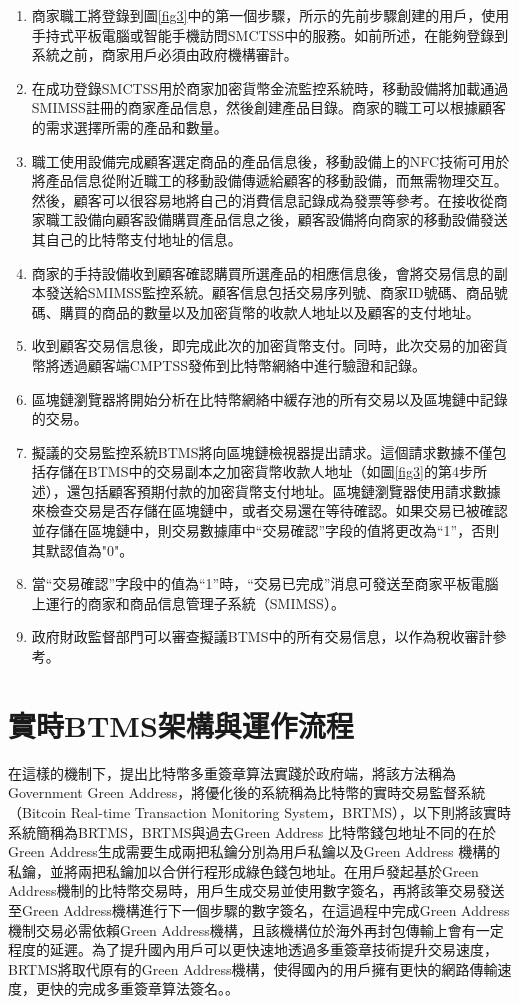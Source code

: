 		\begin{enumerate}
			\item 商家職工將登錄到圖\ref{fig3}中的第一個步驟，所示的先前步驟創建的用戶，使用手持式平板電腦或智能手機訪問SMCTSS中的服務。如前所述，在能夠登錄到系統之前，商家用戶必須由政府機構審計。
			\item 在成功登錄SMCTSS用於商家加密貨幣金流監控系統時，移動設備將加載通過SMIMSS註冊的商家產品信息，然後創建產品目錄。商家的職工可以根據顧客的需求選擇所需的產品和數量。

			\item 職工使用設備完成顧客選定商品的產品信息後，移動設備上的NFC技術可用於將產品信息從附近職工的移動設備傳遞給顧客的移動設備，而無需物理交互。然後，顧客可以很容易地將自己的消費信息記錄成為發票等參考。在接收從商家職工設備向顧客設備購買產品信息之後，顧客設備將向商家的移動設備發送其自己的比特幣支付地址的信息。
			\item 商家的手持設備收到顧客確認購買所選產品的相應信息後，會將交易信息的副本發送給SMIMSS監控系統。顧客信息包括交易序列號、商家ID號碼、商品號碼、購買的商品的數量以及加密貨幣的收款人地址以及顧客的支付地址。
			\item 收到顧客交易信息後，即完成此次的加密貨幣支付。同時，此次交易的加密貨幣將透過顧客端CMPTSS發佈到比特幣網絡中進行驗證和記錄。
			\item 區塊鏈瀏覽器將開始分析在比特幣網絡中緩存池的所有交易以及區塊鏈中記錄的交易。
			\item 擬議的交易監控系統BTMS將向區塊鏈檢視器提出請求。這個請求數據不僅包括存儲在BTMS中的交易副本之加密貨幣收款人地址（如圖\ref{fig3}的第4步所述），還包括顧客預期付款的加密貨幣支付地址。區塊鏈瀏覽器使用請求數據來檢查交易是否存儲在區塊鏈中，或者交易還在等待確認。如果交易已被確認並存儲在區塊鏈中，則交易數據庫中“交易確認”字段的值將更改為“1”，否則其默認值為"0"。
			\item 當“交易確認”字段中的值為“1”時，“交易已完成”消息可發送至商家平板電腦上運行的商家和商品信息管理子系統（SMIMSS）。
			\item 政府財政監督部門可以審查擬議BTMS中的所有交易信息，以作為稅收審計參考。
		\end{enumerate}

\section{實時BTMS架構與運作流程}

		在這樣的機制下，提出比特幣多重簽章算法實踐於政府端，將該方法稱為Government Green Address，將優化後的系統稱為比特幣的實時交易監督系統（Bitcoin Real-time Transaction Monitoring System，BRTMS），以下則將該實時系統簡稱為BRTMS，BRTMS與過去Green Address 比特幣錢包地址不同的在於Green Address生成需要生成兩把私鑰分別為用戶私鑰以及Green Address 機構的私鑰，並將兩把私鑰加以合併行程形成綠色錢包地址。在用戶發起基於Green Address機制的比特幣交易時，用戶生成交易並使用數字簽名，再將該筆交易發送至Green Address機構進行下一個步驟的數字簽名，在這過程中完成Green Address機制交易必需依賴Green Address機構，且該機構位於海外再封包傳輸上會有一定程度的延遲。為了提升國內用戶可以更快速地透過多重簽章技術提升交易速度，BRTMS將取代原有的Green Address機構，使得國內的用戶擁有更快的網路傳輸速度，更快的完成多重簽章算法簽名。\supercite{tanet}。 


